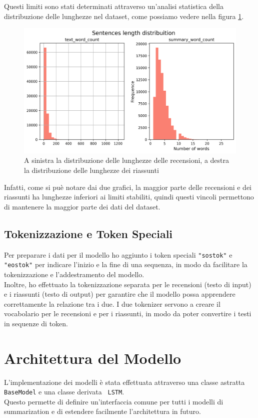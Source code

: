 \documentclass[a4paper, 12pt]{article}
\begin{document}
Questi limiti sono stati determinati attraverso un'analisi statistica della distribuzione delle lunghezze nel dataset, come possiamo vedere nella figura \ref{fig:dataset_length_distribuition}.
\begin{figure}[H]
    \centering
    \includegraphics[width=1\textwidth]{media/dataset_length_distribuition.png}
    \caption{A sinistra la distribuzione delle lunghezze delle recensioni, a destra la distribuzione delle lunghezze dei riassunti}
    \label{fig:dataset_length_distribuition}
\end{figure}
Infatti, come si puè notare dai due grafici, la maggior parte delle recensioni e dei riassunti ha lunghezze inferiori ai limiti stabiliti, quindi questi vincoli permettono di mantenere la maggior parte dei dati del dataset.

\subsection{Tokenizzazione e Token Speciali}
Per preparare i dati per il modello ho aggiunto i token speciali \texttt{"sostok"} e \texttt{"eostok"} per indicare l'inizio e la fine di una sequenza, in modo da facilitare la tokenizzazione e l'addestramento del modello.\\
Inoltre, ho effettuato la tokenizzazione separata per le recensioni (testo di input) e i riassunti (testo di output) per garantire che il modello possa apprendere correttamente la relazione tra i due.
I due tokenizer servono a creare il vocabolario per le recensioni e per i riassunti, in modo da poter convertire i testi in sequenze di token.

\section{Architettura del Modello}
L'implementazione dei modelli è stata effettuata attraverso una classe astratta \texttt{BaseModel} e una classe derivata \texttt{   LSTM}.\\
Questo permette di definire un'interfaccia comune per tutti i modelli di summarization e di estendere facilmente l'architettura in futuro.\\
\end{document}
